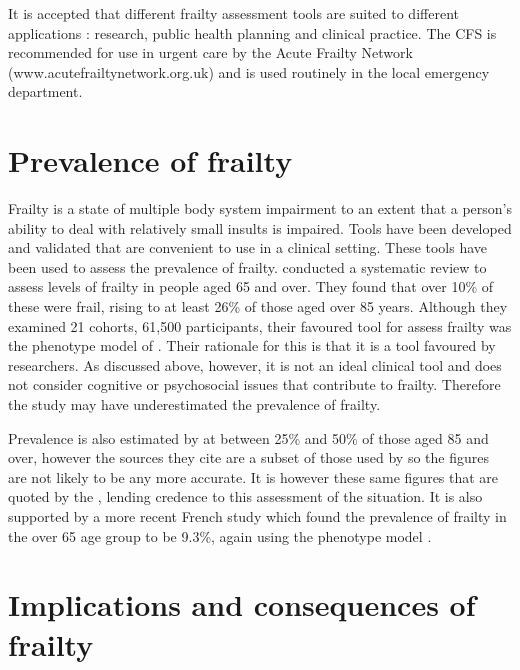 \documentclass
[
	12pt,
	a4paper,
	oneside,
]{report}
\begin{document}
It is accepted that different frailty assessment tools are suited to different
applications \parencite{ensrud:08,martin:08,romero-ortuno:16}: research, public
health planning and clinical practice. The CFS is recommended for use in urgent
care by the Acute Frailty Network (www.acutefrailtynetwork.org.uk) and is
used routinely in the local emergency department.

\section{Prevalence of frailty}
\label{sec:litrevprev}

Frailty is a state of multiple body system impairment to an extent that a
person's ability to deal with relatively small insults is impaired. Tools have 
been developed and validated that are convenient to use in a clinical setting.
These tools have been used to assess the prevalence of frailty. 
\textcite{collard:12} conducted a systematic review 
to assess levels of frailty in people aged 65 and over. They found that over
10\% of these were frail, rising to at least 26\% of those aged over 85 years.
Although they examined 21 cohorts, 61,500 participants, their favoured tool for 
assess frailty was the phenotype model of \textcite{fried:01}. Their rationale
for this is that it is a tool favoured by researchers. As discussed 
above, however, it is not an ideal clinical tool and does not consider cognitive or
psychosocial issues that contribute to frailty. Therefore the study may have 
underestimated the prevalence of frailty.

Prevalence is also estimated by \textcite{clegg:13} at between 25\% and 50\% of
those aged 85 and over, however the sources they cite are a subset of those
used by \textcite{collard:12} so the figures are not likely to be any more
accurate. It is however these same figures that are quoted by the
\textcite{bgs:14}, lending credence to this assessment of the situation. It
is also supported by a more recent French study which found the prevalence of
frailty in the over 65 age group to be 9.3\%, again using the phenotype model
\parencite{cossec:16}.

\section{Implications and consequences of frailty}
\end{document}
